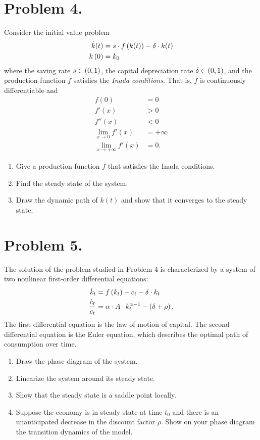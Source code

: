 \documentclass[letterpaper,12pt,leqno]{article}
\begin{document}
\section*{Problem 4.}

Consider the initial value problem 
\begin{align*}
\dot{k}(t) &=s\cdot f\left( k(t) \right) -\delta\cdot  k(t) \\
k\left( 0 \right) &=k_{0}
\end{align*}
where the saving rate $s\in \left( 0,1 \right) $, the capital depreciation rate $\delta \in \left( 0,1 \right)$, and the production function $f$ satisfies the \textit{Inada conditions}. That is, $f$ is continuously differentiable and 
\begin{align*}
f(0)&=0\\
f'(x)&>0\\
f''(x)&<0\\
\lim_{x\to 0} f'(x)&=+\infty\\
\lim_{x\to +\infty} f'(x)&=0.
\end{align*}

\begin{enumerate}
\item Give a production function $f$ that satisfies the Inada conditions.
\item Find the steady state of the system.
\item Draw the dynamic path of $k(t) $ and show that it converges to the steady state.
\end{enumerate}

\section*{Problem 5.}

The solution of the problem studied in Problem 4 is characterized by a system of two nonlinear first-order differential equations:
\begin{align*}
\dot{k}_{t} &=f\left( k_{t} \right) -c_{t}-\delta \cdot k_{t}\\
\frac{\dot{c}_{t}}{c_{t}} &=\alpha \cdot  A \cdot k_{t}^{\alpha -1}-\left( \delta +\rho \right).
\end{align*}
The first differential equation is the law of motion of capital. The second differential equation is the Euler equation, which describes the optimal path of consumption over time.


\begin{enumerate}
\item Draw the phase diagram of the system.
\item Linearize the system around its steady state.
\item Show that the steady state is a saddle point  locally.
\item Suppose the economy is in steady state at time $t_{0}$ and there is an unanticipated decrease in the discount factor $\rho$. Show on your phase diagram the transition dynamics of the model.
\end{enumerate}
\end{document}
